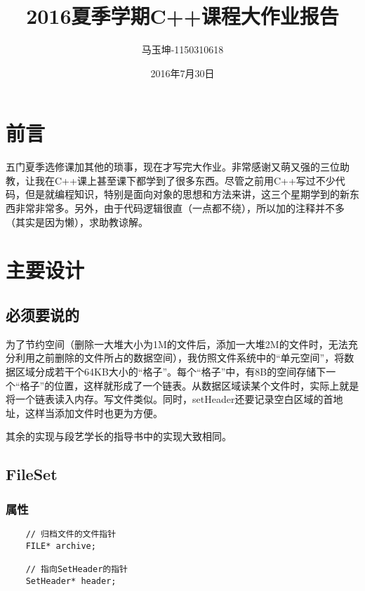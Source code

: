 \documentclass[11pt, a4paper]{book}
\begin{document}
\begin{CJK*}{UTF8}{gbsn}
  \title{\bf 2016夏季学期C++课程大作业报告}
  \author{马玉坤-1150310618}
  \date{2016年7月30日}
  \maketitle
  \renewcommand{\contentsname}{\textbf{目录}}
  \tableofcontents
  \newpage
  \newpage

  \section{前言}

  五门夏季选修课加其他的琐事，现在才写完大作业。非常感谢又萌又强的三位助教，让我在C++课上甚至课下都学到了很多东西。尽管之前用C++写过不少代码，但是就编程知识，特别是面向对象的思想和方法来讲，这三个星期学到的新东西非常非常多。另外，由于代码逻辑很直（一点都不绕），所以加的注释并不多（其实是因为懒），求助教谅解。


  \section{主要设计}

  \subsection{必须要说的}

  为了节约空间（删除一大堆大小为1M的文件后，添加一大堆2M的文件时，无法充分利用之前删除的文件所占的数据空间），我仿照文件系统中的“单元空间”，将数据区域分成若干个64KB大小的“格子”。每个“格子”中，有8B的空间存储下一个“格子”的位置，这样就形成了一个链表。从数据区域读某个文件时，实际上就是将一个链表读入内存。写文件类似。同时，setHeader还要记录空白区域的首地址，这样当添加文件时也更为方便。

  其余的实现与段艺学长的指导书中的实现大致相同。


  \subsection{FileSet}
  
  \subsubsection{属性}
  
  \begin{lstlisting}
    // 归档文件的文件指针
    FILE* archive;

    // 指向SetHeader的指针
    SetHeader* header;


\end{lstlisting}
\end{CJK*}
\end{document}
